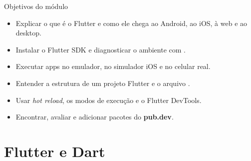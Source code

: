 \documentclass[aspectratio=169,10pt]{beamer}
\begin{document}
\capa

\begin{frame}{Objetivos do módulo}
  \begin{conceito}
    \begin{itemize}
      \item Explicar o que é o Flutter e como ele chega ao Android, ao iOS, à web e ao desktop.
      \item Instalar o Flutter SDK e diagnosticar o ambiente com .
      \item Executar apps no emulador, no simulador iOS e no celular real.
      \item Entender a estrutura de um projeto Flutter e o arquivo .
      \item Usar \emph{hot reload}, os modos de execução e o Flutter DevTools.
      \item Encontrar, avaliar e adicionar pacotes do \textbf{pub.dev}.
    \end{itemize}
  \end{conceito}
\end{frame}

\sumario



\section{Flutter e Dart}
\end{document}
